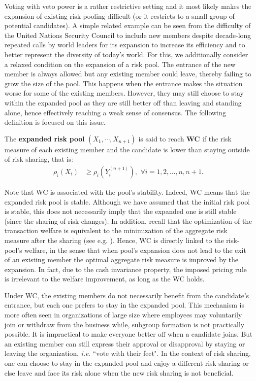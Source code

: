 \documentclass[fleqn,mnsc,nonblindrev]{informs4}
\begin{document}
Voting with veto power is a rather restrictive setting and it most likely makes the expansion of existing risk pooling difficult (or it restricts to a small group of potential candidates). A simple related example can be seen from the difficulty of the United Nations Security Council to include new members despite decade-long repeated calls by world leaders for its expansion to increase its efficiency and to better represent the diversity of today's world. For this, we additionally consider a relaxed condition on the expansion of a risk pool. The entrance of the new member is always allowed but any existing member could leave, thereby failing to grow the size of the pool. This happens when the entrance makes the situation worse for some of the existing members. However, they may still choose to stay within the expanded pool as they are still better off than leaving and standing alone, hence effectively reaching a weak sense of consensus. The following definition is focused on this issue. 
\begin{definition}\label{def:strong}
The {\bf expanded risk pool} $(X_1, \cdots, X_{n+1})$ is said to reach {\bf WC} if the risk measure of each existing member and the candidate is lower than staying outside of risk sharing, that is:
\begin{align}
\rho_i(X_i)&\geq \rho_i(Y_i^{(n+1)}),\,\, \forall i=1,2,...,n,n+1.
\end{align}
\end{definition}

\begin{remark}
Note that WC is associated with the pool's stability. Indeed, WC means that the expanded risk pool is stable. Although we have assumed that the initial risk pool is stable, this does not necessarily imply that the expanded one is still stable (since the sharing of risk changes).    {In addition, recall that the optimization of the transaction welfare is equivalent to the minimization of the aggregate risk measure after the sharing (see e.g. \cite{barrieu2005inf}). Hence, WC is directly linked to the risk-pool's welfare, in the sense that when pool's expansion does not lead to the exit of an existing member the optimal aggregate risk measure is improved by the expansion. In fact, due to the cash invariance property, the imposed pricing rule is irrelevant to the welfare improvement, as long as the WC holds.}   
\end{remark}

Under WC, the existing members do not necessarily benefit from the candidate's entrance, but each one prefers to stay in the expanded pool. This mechanism is more often seen in organizations of large size where employees may voluntarily join or withdraw from the business    {while, subgroup formation is not practically possible}. It is impractical to make everyone better off when a candidate joins. But an existing member can still express their approval or disapproval by staying or leaving the organization, {\it i.e.} ``vote with their feet". In the context of risk sharing, one can choose to stay in the expanded pool and enjoy a different risk sharing or else leave and face its risk alone when the new risk sharing is not beneficial.
\end{document}
